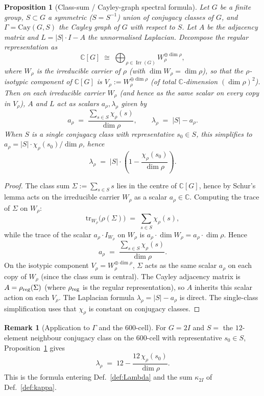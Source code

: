 \documentclass[11pt, a4paper]{amsart}
\newtheorem{proposition}[theorem]{Proposition}
\theoremstyle{definition}
\newtheorem{remark}[theorem]{Remark}
\newcommand{\C}{\mathbb{C}}
\newcommand{\Irr}{\operatorname{Irr}}
\newcommand{\kappaTwoI}{\kappa_{2I}}
\begin{document}
\begin{proposition}[Class-sum / Cayley-graph spectral
  formula]
\label{prop:class-sum}
Let $G$ be a finite group, $S \subset G$ a symmetric
($S = S^{-1}$) union of conjugacy classes of $G$, and
$\Gamma = \mathrm{Cay}(G, S)$ the Cayley graph of $G$ with
respect to $S$. Let $A$ be the adjacency matrix and $L =
|S| \cdot I - A$ the unnormalised Laplacian. Decompose the
regular representation as
\[
  \C[G] \;\cong\; \bigoplus_{\rho \in \Irr(G)}
    W_\rho^{\oplus \dim \rho},
\]
where $W_\rho$ is the irreducible carrier of $\rho$ (with
$\dim W_\rho = \dim \rho$), so that the $\rho$-\emph{isotypic
component} of $\C[G]$ is $V_\rho := W_\rho^{\oplus \dim \rho}$
(of total $\C$-dimension $(\dim \rho)^2$).
Then on each irreducible carrier $W_\rho$ (and hence as the
same scalar on every copy in $V_\rho$), $A$ and $L$ act as
scalars $a_\rho, \lambda_\rho$ given by
\[
  a_\rho \;=\; \frac{\sum_{s \in S} \chi_\rho(s)}{\dim \rho},
  \qquad
  \lambda_\rho \;=\; |S| - a_\rho.
\]
When $S$ is a single conjugacy class with representative
$s_0 \in S$, this simplifies to $a_\rho = |S| \cdot
\chi_\rho(s_0) / \dim \rho$, hence
\[
  \lambda_\rho \;=\; |S| \cdot \left(1 -
    \frac{\chi_\rho(s_0)}{\dim \rho}\right).
\]
\end{proposition}

\begin{proof}
The class sum $\Sigma := \sum_{s \in S} s$ lies in the centre
of $\C[G]$, hence by Schur's lemma acts on the irreducible
carrier $W_\rho$ as a scalar $a_\rho \in \C$. Computing the
trace of $\Sigma$ on $W_\rho$:
\[
  \mathrm{tr}_{W_\rho}\bigl(\rho(\Sigma)\bigr)
  \;=\; \sum_{s \in S} \chi_\rho(s),
\]
while the trace of the scalar $a_\rho \cdot I_{W_\rho}$ on
$W_\rho$ is $a_\rho \cdot \dim W_\rho = a_\rho \cdot \dim
\rho$. Hence
\[
  a_\rho \;=\;
  \frac{\sum_{s \in S} \chi_\rho(s)}{\dim \rho}.
\]
On the isotypic component $V_\rho = W_\rho^{\oplus \dim
\rho}$, $\Sigma$ acts as the same scalar $a_\rho$ on each
copy of $W_\rho$ (since the class sum is central).
The Cayley adjacency matrix is $A = \rho_{\rm reg}(\Sigma)$
(where $\rho_{\rm reg}$ is the regular representation),
so $A$ inherits this scalar action on each $V_\rho$.
The Laplacian formula $\lambda_\rho = |S| - a_\rho$ is
direct. The single-class simplification uses that $\chi_\rho$
is constant on conjugacy classes.
\end{proof}

\begin{remark}[Application to $\Gamma$ and the $600$-cell]
\label{rmk:Lambda-application}
For $G = 2I$ and $S = $ the $12$-element neighbour conjugacy
class on the $600$-cell with representative $s_0 \in S$,
Proposition~\ref{prop:class-sum} gives
\[
  \lambda_\rho \;=\; 12 - \frac{12 \, \chi_\rho(s_0)}{\dim
    \rho}.
\]
This is the formula entering Def.~\ref{def:Lambda} and the
sum $\kappaTwoI$ of Def.~\ref{def:kappa}.
\end{remark}
\end{document}
